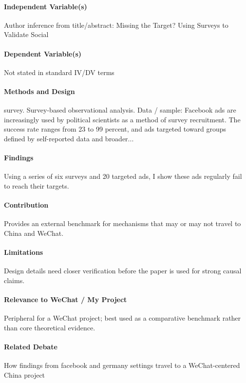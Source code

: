 \documentclass[12pt]{article}
\begin{document}
\paragraph{Independent Variable(s)} Author inference from title/abstract: Missing the Target? Using Surveys to Validate Social

\paragraph{Dependent Variable(s)} Not stated in standard IV/DV terms

\paragraph{Methods and Design} survey. Survey-based observational analysis. Data / sample: Facebook ads are increasingly used by political scientists as a method of survey recruitment. The success rate ranges from 23 to 99 percent, and ads targeted toward groups defined by self-reported data and broader...

\paragraph{Findings} Using a series of six surveys and 20 targeted ads, I show these ads regularly fail to reach their targets.

\paragraph{Contribution} Provides an external benchmark for mechanisms that may or may not travel to China and WeChat.

\paragraph{Limitations} Design details need closer verification before the paper is used for strong causal claims.

\paragraph{Relevance to WeChat / My Project} Peripheral for a WeChat project; best used as a comparative benchmark rather than core theoretical evidence.

\paragraph{Related Debate} How findings from facebook and germany settings travel to a WeChat-centered China project
\end{document}
